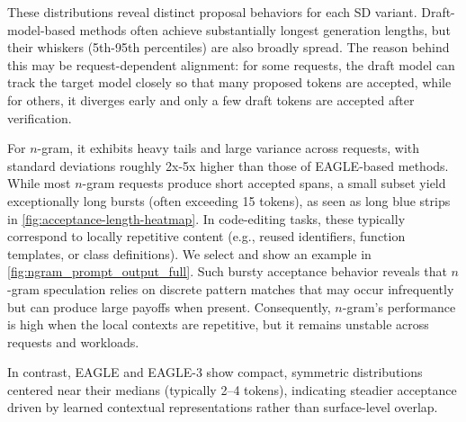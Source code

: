 
These distributions reveal distinct proposal behaviors for each SD variant. Draft-model-based methods often achieve substantially longest generation lengths, but their whiskers (5th-95th percentiles) are also broadly spread. 
The reason behind this may be request-dependent alignment: for some requests, the draft model can track the target model closely so that many proposed tokens are accepted, while for others, it diverges early and only a few draft tokens are accepted after verification.

For $n$-gram, it exhibits heavy tails and large variance across requests, with standard deviations roughly 2x-5x higher than those of EAGLE-based methods. 
While most $n$-gram requests produce short accepted spans, a small subset yield exceptionally long bursts (often exceeding 15 tokens), as seen as long blue strips in \autoref{fig:acceptance-length-heatmap}. 
In code-editing tasks, these typically correspond to locally repetitive content (e.g., reused identifiers, function templates, or class definitions). We select and show an example in \autoref{fig:ngram_prompt_output_full}. Such bursty acceptance behavior reveals that $n$-gram speculation relies on discrete pattern matches that may occur infrequently but can produce large payoffs when present. Consequently, $n$-gram's performance is high when the local contexts are repetitive, but it remains unstable across requests and workloads.


In contrast, EAGLE and EAGLE-3 show compact, symmetric distributions centered near their medians (typically 2–4 tokens), indicating steadier acceptance driven by learned contextual representations rather than surface-level overlap.


